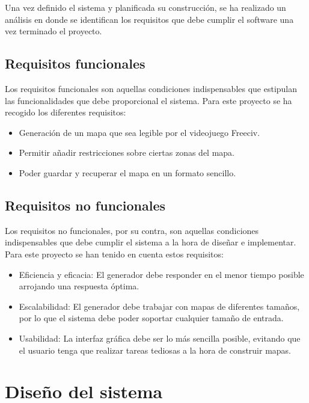Una vez definido el sistema y planificada su construcción, se ha realizado un análisis en donde se identifican los requisitos que debe cumplir el software una vez terminado el proyecto.

\subsection{Requisitos funcionales}
\label{subsec:funcrequirements}

Los requisitos funcionales son aquellas condiciones indispensables que estipulan las funcionalidades que debe proporcional el sistema. Para este proyecto se ha recogido los diferentes requisitos:

\begin{itemize}
	\item Generación de un mapa que sea legible por el videojuego Freeciv.
	\item Permitir añadir restricciones sobre ciertas zonas del mapa.
	\item Poder guardar y recuperar el mapa en un formato sencillo.
\end{itemize}

\subsection{Requisitos no funcionales}

Los requisitos no funcionales, por su contra, son aquellas condiciones indispensables que debe cumplir el sistema a la hora de diseñar e implementar. Para este proyecto se han tenido en cuenta estos requisitos:

\begin{itemize}
	\item Eficiencia y eficacia: El generador debe responder en el menor tiempo posible arrojando una respuesta óptima.
	\item Escalabilidad: El generador debe trabajar con mapas de diferentes tamaños, por lo que el sistema debe poder soportar cualquier tamaño de entrada.
	\item Usabilidad: La interfaz gráfica debe ser lo más sencilla posible, evitando que el usuario tenga que realizar tareas tediosas a la hora de construir mapas.
\end{itemize}

\section{Diseño del sistema}

